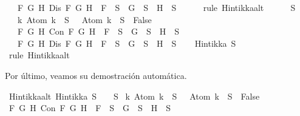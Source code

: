 \begin{isabellebody}
\ \ {\isasymand}\ {\isacharparenleft}{\isasymforall}F\ G\ H{\isachardot}\ Dis\ F\ G\ H\ {\isasymlongrightarrow}\ F\ {\isasymin}\ S\ {\isasymlongrightarrow}\ G\ {\isasymin}\ S\ {\isasymor}\ H\ {\isasymin}\ S{\isacharparenright}{\isacharparenright}{\isachardoublequoteclose}\isanewline
\ \ \ \ \isamarkupfalse%
\ {\isacharparenleft}rule\ Hintikka{\isacharunderscore}alt{}{\isacharparenright}\isanewline
{}\isamarkupfalse%
\isanewline
\ \ \isamarkupfalse%
\ {\isachardoublequoteopen}{\isacharparenleft}{\isasymbottom}\ {\isasymnotin}\ S\isanewline
\ \ {\isasymand}\ {\isacharparenleft}{\isasymforall}k{\isachardot}\ Atom\ k\ {\isasymin}\ S\ {\isasymlongrightarrow}\ \isactrlbold {\isasymnot}\ {\isacharparenleft}Atom\ k{\isacharparenright}\ {\isasymin}\ S\ {\isasymlongrightarrow}\ False{\isacharparenright}\isanewline
\ \ {\isasymand}\ {\isacharparenleft}{\isasymforall}F\ G\ H{\isachardot}\ Con\ F\ G\ H\ {\isasymlongrightarrow}\ F\ {\isasymin}\ S\ {\isasymlongrightarrow}\ G\ {\isasymin}\ S\ {\isasymand}\ H\ {\isasymin}\ S{\isacharparenright}\isanewline
\ \ {\isasymand}\ {\isacharparenleft}{\isasymforall}F\ G\ H{\isachardot}\ Dis\ F\ G\ H\ {\isasymlongrightarrow}\ F\ {\isasymin}\ S\ {\isasymlongrightarrow}\ G\ {\isasymin}\ S\ {\isasymor}\ H\ {\isasymin}\ S{\isacharparenright}{\isacharparenright}{\isachardoublequoteclose}\isanewline
\ \ \isamarkupfalse%
\ {\isachardoublequoteopen}Hintikka\ S{\isachardoublequoteclose}\isanewline
\ \ \ \ \isamarkupfalse%
\ {\isacharparenleft}rule\ Hintikka{\isacharunderscore}alt{}{\isacharparenright}\isanewline
{}\isamarkupfalse%
%
\endisatagproof
{\isafoldproof}%
%
\isadelimproof
%
\endisadelimproof
%
\begin{isamarkuptext}%
Por último, veamos su demostración automática.%
\end{isamarkuptext}\isamarkuptrue%
\isamarkupfalse%
\ Hintikka{\isacharunderscore}alt{\isacharcolon}\ {\isachardoublequoteopen}Hintikka\ S\ {\isacharequal}\ {\isacharparenleft}{\isasymbottom}\ {\isasymnotin}\ S\isanewline
{\isasymand}\ {\isacharparenleft}{\isasymforall}k{\isachardot}\ Atom\ k\ {\isasymin}\ S\ {\isasymlongrightarrow}\ \isactrlbold {\isasymnot}\ {\isacharparenleft}Atom\ k{\isacharparenright}\ {\isasymin}\ S\ {\isasymlongrightarrow}\ False{\isacharparenright}\isanewline
{\isasymand}\ {\isacharparenleft}{\isasymforall}F\ G\ H{\isachardot}\ Con\ F\ G\ H\ {\isasymlongrightarrow}\ F\ {\isasymin}\ S\ {\isasymlongrightarrow}\ G\ {\isasymin}\ S\ {\isasymand}\ H\ {\isasymin}\ S{\isacharparenright}\isanewline

\end{isabellebody}
